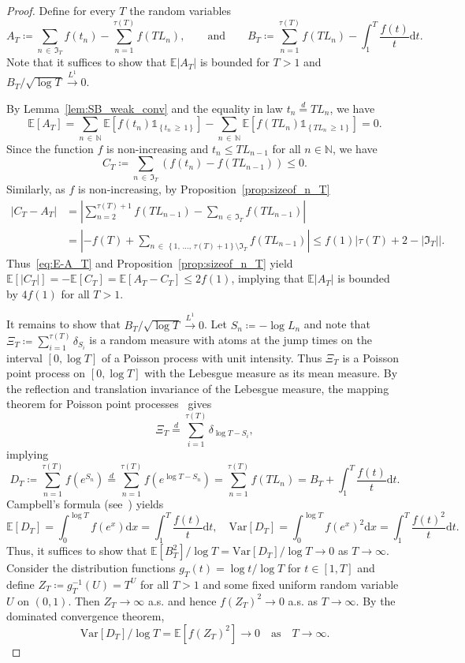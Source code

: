 \documentclass[AHL,Unicode,longabstracts,published]{cedram}
\newcommand\N{\mathbb{N}}
\newcommand\E{\mathds{E}}
\newcommand\1{\mathds{1}}
\newcommand\D{\mathrm{d}}
\newcommand\GI{\mathfrak{I}}
\newcommand\eqd{\overset{d}{=}}
\newcommand\ciL{\xrightarrow{L^1}}
\newcommand\Var{\mbox{Var}}
\begin{document}
\begin{proof}
Define for every $T$ the random variables
\[
A_T\coloneqq \sum_{n\,\in\,\GI_T}f(t_n) -\sum_{n=1}^{\tau(T)}f(TL_{n}),
\qquad\text{and}\qquad B_T\coloneqq \sum_{n=1}^{\tau(T)}f\left(TL_{n}\right) -\int_1^T \frac{f(t)}{t}\D t.
\]
Note that it suffices to show that $\E|A_T|$ is bounded for $T>1$ and $B_T/\sqrt{\log T}\ciL 0$.

By Lemma~\ref{lem:SB_weak_conv} and the equality in law $t_n\eqd TL_n$, we have
\begin{equation}\label{eq:E-A_T}
\E[A_T] =\sum_{n\,\in\,\N}\E\left[f(t_n)\1_{\left\{t_n\,\ge\,1\right\}}\right] -\sum_{n\,\in\,\N}\E\left[f\left(TL_n\right)\1_{\left\{TL_n\,\ge\,1\right\}}\right] =0.
\end{equation}
Since the function $f$ is non-increasing and $t_n\leq T L_{n-1}$ for all $n\in\N$, we have 
\[
C_T\coloneqq \sum_{n\,\in\,\GI_T}\left(f(t_n)-f(TL_{n-1})\right)\le 0.
\]
Similarly, as $f$ is non-increasing, by Proposition~\ref{prop:sizeof_n_T}
\begin{align*}
\left|C_T-A_T\right| &=\left|\sum_{n=2}^{\tau(T)+1}f\left(TL_{n-1}\right) -\sum_{n\,\in\,\GI_T}f\left(TL_{n-1}\right)\right|\\
&=\left|-f(T)+\sum_{n\,\in\,\left\{1,\,\ldots,\,\tau(T)+1\right\}\setminus \GI_T}f\left(TL_{n-1}\right)\right|
\le f(1)\big|\tau(T)+2-\left|\GI_T\right|\big|.
\end{align*}
Thus~\eqref{eq:E-A_T} and Proposition~\ref{prop:sizeof_n_T} yield $\E[|C_T|]=-\E[C_T]=\E[A_T-C_T]\le 2f(1)$, implying that $\E|A_T|$ is bounded by $4f(1)$ for all $T>1$.

It remains to show that $B_T/\sqrt{\log T}\ciL 0$. Let $S_n\coloneqq-\log L_n$ and note that $\Xi_T\coloneqq\sum_{i=1}^{\tau(T)}\delta_{S_i}$ is a random measure with atoms at the jump times on the interval $[0,\log T]$ of a Poisson process with unit intensity. Thus $\Xi_T$ is a Poisson point process on $[0,\log T]$ with the Lebesgue measure as its mean measure. By the reflection and translation invariance of the Lebesgue measure, the mapping theorem for Poisson point processes~\cite[Section~2.3]{MR1207584} gives
\[
\Xi_T\eqd\sum_{i=1}^{\tau(T)}\delta_{\log T-S_i},
\]
implying
\[
D_T\coloneqq \sum_{n=1}^{\tau(T)}f\left(e^{S_n}\right)
\eqd\sum_{n=1}^{\tau(T)}f\left(e^{\log T-S_n}\right) =\sum_{n=1}^{\tau(T)}f(TL_n) =B_T+\int_1^T \frac{f(t)}{t}\D t.
\]
Campbell's formula (see~\cite[p.~28]{MR1207584}) yields
\[
\E[D_T]=\int_0^{\log T}f(e^x)\D x =\int_1^T\frac{f(t)}{t}\D t,
\quad
\Var[D_T]=\int_0^{\log T}f(e^x)^2\D x =\int_1^T\frac{f(t)^2}{t}\D t.
\]
Thus, it suffices to show that $\E[B_T^2]/\log T=\Var[D_T]/\log T \to 0$ as $T \to \infty$. Consider the distribution functions $g_T(t)=\log t/\log T$ for $t\in[1,T]$ and define $Z_T\coloneqq g_T^{-1}(U)=T^U$ for all $T>1$ and some fixed uniform random variable $U$ on $(0,1)$. Then $Z_T\to\infty$ a.s. and hence $f(Z_T)^2\to 0$ a.s. as $T\to\infty$. By the dominated convergence theorem,
\[
\Var[D_T]/\log T=\E\left[f\left(Z_T\right)^2\right]\to 0\quad\text{as}\quad T \to \infty.
\]
\end{proof}
\end{document}
